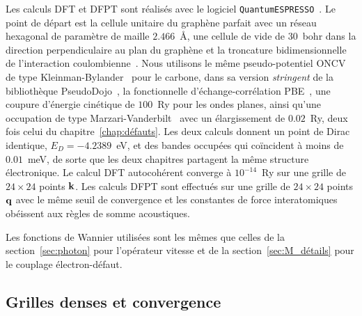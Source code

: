 Les calculs DFT et DFPT sont réalisés avec le logiciel \texttt{QuantumESPRESSO}~\cite{giannozziQUANTUMESPRESSOModular2009,giannozziAdvancedCapabilitiesMaterials2017,giannozziQuantumESPRESSOExascale2020}. Le point de départ est la cellule unitaire du graphène parfait avec un réseau hexagonal de paramètre de maille $2.466$~\AA, une cellule de vide de $30$~bohr dans la direction perpendiculaire au plan du graphène et la troncature bidimensionnelle de l'interaction coulombienne~\cite{sohierDensityFunctionalPerturbation2017}. Nous utilisons le même pseudo-potentiel ONCV~\cite{hamannOptimizedNormconservingVanderbilt2013} de type Kleinman-Bylander~\cite{kleinmanEfficaciousFormModel1982} pour le carbone, dans sa version \textit{stringent} de la bibliothèque PseudoDojo~\cite{vansettenPseudoDojoTrainingGrading2018}, la fonctionnelle d'échange-corrélation PBE~\cite{perdewGeneralizedGradientApproximation1996a}, une coupure d'énergie cinétique de $100$~Ry pour les ondes planes, ainsi qu'une occupation de type Marzari-Vanderbilt~\cite{marzariThermalContractionDisordering1999} avec un élargissement de $0.02$~Ry, deux fois celui du chapitre~\ref{chap:défauts}. Les deux calculs donnent un point de Dirac identique, $E_D=-4.2389$~eV, et des bandes occupées qui coïncident à moins de $0.01$~meV, de sorte que les deux chapitres partagent la même structure électronique. Le calcul DFT autocohérent converge à $10^{-14}$~Ry sur une grille de $24\times 24$ points $\mathbf{k}$. Les calculs DFPT sont effectués sur une grille de $24\times 24$ points $\mathbf{q}$ avec le même seuil de convergence et les constantes de force interatomiques obéissent aux règles de somme acoustiques.

Les fonctions de Wannier utilisées sont les mêmes que celles de la section~\ref{sec:photon} pour l'opérateur vitesse et de la section~\ref{sec:M_détails} pour le couplage électron-défaut.

\subsection{Grilles denses et convergence}

